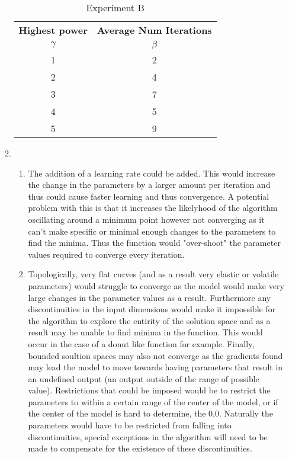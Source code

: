 \documentclass{article}
\begin{document}
\begin{enumerate}
\begin{enumerate}[label=\arabic*)]
\begin{table}[h!]
 						\begin{center}
    						\caption{Experiment B}
    						\label{tab:table2}
    						\begin{tabular}{c|c}
      						\textbf{Highest power} & \textbf{Average Num Iterations} \\
      						$\gamma$ & $\beta$\\
      						\hline
      						1 & 2\\
      						2 & 4\\
      						3 & 7\\
      						4 & 5 \\
      						5 & 9 \\
    						\end{tabular}
  						\end{center}
					\end{table}
				\item
					\begin{enumerate}[label=\alph*)]
						\item The addition of a learning rate could be added. This would increase the change in the parameters by a larger amount per iteration and thus could cause faster learning and thus convergence. A potential problem with this is that it increases the likelyhood of the algorithm oscillating around a minimum point however not converging as it can't make specific or minimal enough changes to the parameters to find the minima. Thus the function would "over-shoot" the parameter values required to converge every iteration. \\
						\item Topologically, very flat curves (and as a result very elastic or volatile parameters) would struggle to converge as the model would make very large changes in the parameter values as a result. Furthermore any discontinuities in the input dimensions would make it impossible for the algorithm to explore the entirity of the solution space and as a result may be unable to find minima in the function. This would occur in the case of a donut like function for example. Finally, bounded soultion spaces may also not converge as the gradients found may lead the model to move towards having parameters that result in an undefined output (an output outside of the range of possible value). Restrictions that could be imposed would be to restrict the parameters to within a certain range of the center of the model, or if the center of the model is hard to determine, the 0,0. Naturally the parameters would have to be restricted from falling into discontinuities, special exceptions in the algorithm will need to be made to compensate for the existence of these discontinuities.

\end{enumerate}
\end{enumerate}
\end{enumerate}
\end{document}

